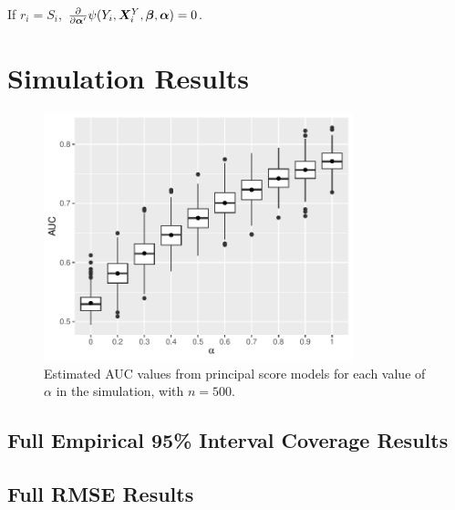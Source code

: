 \documentclass{statsoc} %
\begin{document}
If $r_i=S_i$, $\frac{\partial}{\partial \bm{\alpha}'}\psi(Y_i,\bm{X}^Y_i,\bm{\beta},\bm{\alpha})=0$.

\clearpage
\section{Simulation Results}

\begin{figure}[!h]
    \centering
    \includegraphics[width=0.8\textwidth]{simFigs/alphaAUC.pdf}
    \caption{Estimated AUC values from principal score models for each value of $\alpha$ in the simulation, with $n=500$.}
    \label{fig:alphaAUC}
\end{figure}

\subsection{Full Empirical 95\% Interval Coverage Results}


\clearpage
\subsection{Full RMSE Results}



\end{document}
